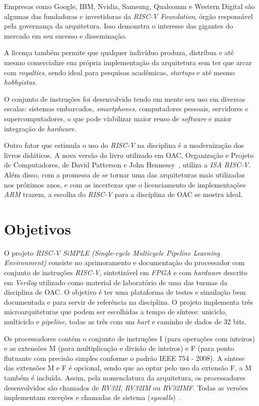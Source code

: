 { Empresas como Google, IBM, Nvidia, Samsung, Qualcomm e Western Digital são
    algumas das fundadoras e investidoras da \textit{RISC-V Foundation}, órgão
    responsável pela governança da arquitetura. Isso demonstra o interesse das
    gigantes do mercado em seu sucesso e disseminação.
}

{ A licença também permite que qualquer indivíduo produza, distribua e
    até mesmo comercialize sua própria implementação da arquitetura sem ter
    que arcar com \textit{royalties}, sendo ideal para pesquisas acadêmicas,
    \textit{startups} e até mesmo \textit{hobbyistas}.
}

{ O conjunto de instruções foi desenvolvido tendo em mente seu uso em
    diversas escalas: sistemas embarcados, \textit{smartphones},
    computadores pessoais, servidores e supercomputadores, o que pode viabilizar
    maior reuso de \textit{software} e maior integração de
    \textit{hardware}.
}

{ Outro fator que estimula o uso do \textit{RISC-V} na disciplina é a modernização
    dos livros didáticos. A nova versão do livro utilizado em OAC, Organização
    e Projeto de Computadores, de David Patterson e John
    Hennessy~\cite{patterson2021computer}, utiliza a \textit{ISA RISC-V}.
    Além disso, com a promessa de se tornar uma das arquiteturas mais utilizadas
    nos próximos anos, e com as incertezas que o licenciamento de implementações
    \textit{ARM} trazem, a escolha do \textit{RISC-V} para a disciplina de
    OAC se mostra ideal.
}

\section{Objetivos}
{ O projeto \textit{RISC-V SiMPLE (Single-cycle Multicycle Pipeline Learning
    Environment)} consiste no aprimoramento e documentação do processador com
    conjunto de instruções \textit{RISC-V}, sintetizável em \textit{FPGA} e com
    \textit{hardware} descrito em \textit{Verilog} utilizado como material de
    laboratório de uma das turmas da disciplina de OAC. O objetivo é ter uma
    plataforma de testes e simulação bem documentada e para servir de referência
    na disciplina. O projeto implementa três microarquiteturas que podem ser
    escolhidas a tempo de síntese: uniciclo, multiciclo e \textit{pipeline},
    todas as três com um \textit{hart} e caminho de dados de 32 bits.
}

{ Os processadores contém o conjunto de instruções I (para operações com
    inteiros) e as extensões M (para multiplicação e divisão de inteiros) e F
    (para ponto flutuante com precisão simples conforme o padrão IEEE 754 - 2008).
    A síntese das extensões M e F é opcional, sendo que ao optar pelo uso da
    extensão F, a M também é incluída. Assim, pela nomenclatura da arquitetura,
    os processadores desenvolvidos são chamados de \textit{RV32I}, \textit{RV32IM}
    ou \textit{RV32IMF}. Todas as versões implementam exceções e chamadas de sistema
    (\textit{syscalls})~\cite{riscv_spec2}.
}

